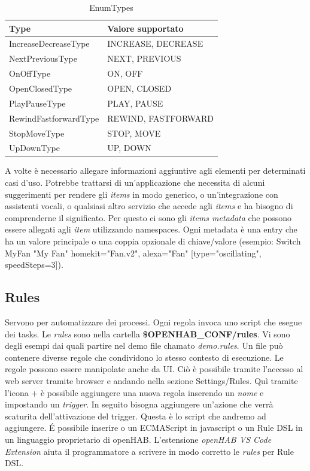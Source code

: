 \begin{table}[]
    \centering
    \begin{tabular}{l|l}
        \textbf{Type} & \textbf{Valore supportato} \\
        \hline
        IncreaseDecreaseType & INCREASE, DECREASE\\
        NextPreviousType & NEXT, PREVIOUS\\
        OnOffType & ON, OFF\\
        OpenClosedType & OPEN, CLOSED\\
        PlayPauseType & PLAY, PAUSE\\
        RewindFastforwardType & REWIND, FASTFORWARD\\
        StopMoveType & STOP, MOVE\\
        UpDownType & UP, DOWN
    \end{tabular}
    \caption{EnumTypes}
    \label{tab:enum_types}
\end{table}

A volte è necessario allegare informazioni aggiuntive agli elementi per determinati casi d'uso. Potrebbe trattarsi di un'applicazione che necessita di alcuni suggerimenti per rendere gli {\em items} in modo generico, o un'integrazione con assistenti vocali, o qualsiasi altro servizio che accede agli {\em items} e ha bisogno di comprenderne il significato. Per questo ci sono gli {\em items metadata} che possono essere allegati agli {\em item} utilizzando namespaces. Ogni metadata è una entry che ha un valore principale o una coppia opzionale di chiave/valore (esempio: Switch MyFan "My Fan" {homekit="Fan.v2", alexa="Fan" [type="oscillating", speedSteps=3]}).

\subsection{Rules} Servono per automatizzare dei processi. Ogni regola invoca uno script che esegue dei tasks. Le {\em rules} sono nella cartella \textbf{\$OPENHAB\_CONF/rules}. Vi sono degli esempi dai quali partire nel demo file chamato {\em demo.rules}. Un file può contenere diverse regole che condividono lo stesso contesto di esecuzione. Le regole possono essere manipolate anche da UI. Ciò è possibile tramite l'accesso al web server tramite browser e andando nella sezione Settings/Rules. Quì tramite l'icona + è possibile aggiungere una nuova regola inserendo un {\em nome} e impostando un {\em trigger}. In seguito bisogna aggiungere un'azione che verrà scaturita dell'attivazione del trigger. Questa è lo script che andremo ad aggiungere. \'E possibile inserire o un ECMAScript in javascript o un Rule DSL in un linguaggio proprietario di openHAB. L'estensione {\em openHAB VS Code Extension} aiuta il programmatore a scrivere in modo corretto le {\em rules} per Rule DSL.

